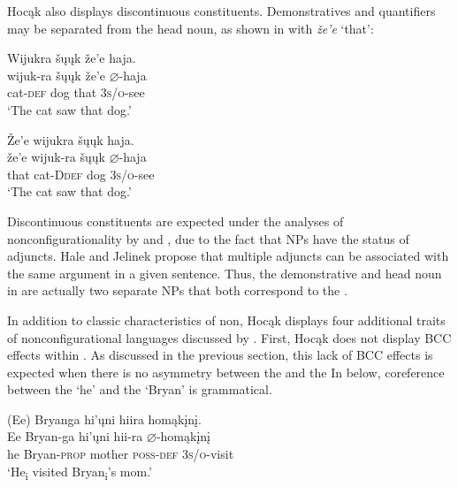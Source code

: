 \documentclass[output=paper]{LSP/langsci}
\begin{document}
Hocąk also displays discontinuous constituents. Demonstratives and quantifiers may be separated from the head noun, as shown in  with \textit{\v{z}e'e} `that': 

\ea\label{ex:jrs:15}
\ea \label{ex:jrs:15a}
\glll Wijukra	\v{s}\k{u}\k{u}k	\v{z}e'e	haja. \\
wijuk-ra	\v{s}\k{u}\k{u}k	\v{z}e'e	$\varnothing$-haja \\
	cat-\textsc{def} 	dog	that		\textsc{3s/o}-see\\
\trans `The cat saw that dog.' 

\ex \label{ex:jrs:15b}
\glll \v{Z}e'e	wijukra	 \v{s}\k{u}\k{u}k	haja. \\
\v{z}e'e	wijuk-ra	\v{s}\k{u}\k{u}k	$\varnothing$-haja \\
that cat-D\textsc{def} dog \textsc{3s/o}-see \\
\trans `The cat saw that dog.'
\z 
\z 

Discontinuous constituents are expected under 
the analyses of nonconfigurationality by \citet{Hale1983} and \citet{Jelinek1984}, %
  due to the fact that NPs have the status of adjuncts. Hale and Jelinek propose that multiple adjuncts can be associated with the same argument in a given sentence. Thus, the demonstrative and head noun in  are actually two separate NPs that both correspond to the .

In addition to  classic characteristics of non, Ho\-cąk displays four additional traits of nonconfigurational languages discussed by \citet{Baker1996}. First, Hocąk does not display BCC effects within .  As discussed in the previous section, this lack of BCC effects is expected when there is no asymmetry between the  and the  In  below, coreference between the  `he' and the  `Bryan' is grammatical.

\begin{exe}
\ex\label{ex:jrs:16}	
\glll (Ee) 	Bryanga 			hi'\k{u}ni 	hiira 				homąk\k{i}n\k{i}. \\
Ee 		Bryan-ga 		hi'\k{u}ni 	hii-ra 			$\varnothing$-homąk\k{i}n\k{i} \\
he 		Bryan-\textsc{prop} mother 	\textsc{poss-def} 	\textsc{3s/o}-visit  \\
\trans `He\textsubscript{i} visited Bryan\textsubscript{i}'s mom.'
\end{exe}
 
\end{document}
